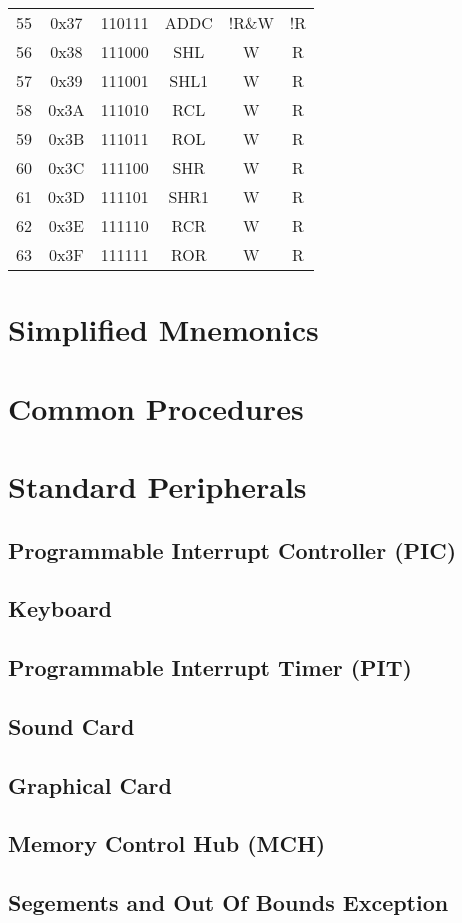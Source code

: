 \documentclass[oneside, a4paper]{memoir}
\begin{document}
\begin{center}
\begin{longtable}{cccccc}
55 & 0x37 & 110111 & ADDC  & !R\&W & !R  \\
56 & 0x38 & 111000 & SHL   & W     & R   \\
57 & 0x39 & 111001 & SHL1  & W     & R   \\
58 & 0x3A & 111010 & RCL   & W     & R   \\
59 & 0x3B & 111011 & ROL   & W     & R   \\
60 & 0x3C & 111100 & SHR   & W     & R   \\
61 & 0x3D & 111101 & SHR1  & W     & R   \\
62 & 0x3E & 111110 & RCR   & W     & R   \\
63 & 0x3F & 111111 & ROR   & W     & R   \\
\end{longtable}
\end{center}

\chapter{Simplified Mnemonics}

\chapter{Common Procedures}

\chapter{Standard Peripherals}
\section{Programmable Interrupt Controller (PIC)}
\section{Keyboard}
\section{Programmable Interrupt Timer (PIT)}
\section{Sound Card}
\section{Graphical Card}
\section{Memory Control Hub (MCH)}
\section{Segements and Out Of Bounds Exception}
\end{document}
